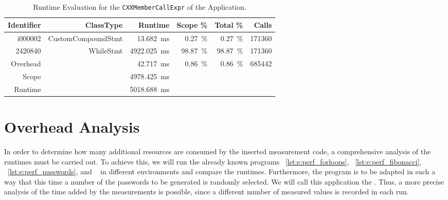 \begin{table}
  \centering
  \caption[Runtime Evaluation for the \lstinline{CXXMCall} of the \PRIME Application.]{Runtime Evaluation for the \lstinline{CXXMemberCallExpr} of the \PRIME Application.}
  \begin{tabular}{rrrrrr}
    \toprule
    Identifier & ClassType          & Runtime                      &  Scope \%            &  Total \%            & Calls\\
    \midrule
    i000002    & CustomCompoundStmt & \SI{13.682}{\milli\second}   & \SI{0.27}{\percent}  & \SI{0.27}{\percent}  & 171360 \\
    2420840    & WhileStmt          & \SI{4922.025}{\milli\second} & \SI{98.87}{\percent} & \SI{98.87}{\percent} & 171360 \\
    Overhead   &                    & \SI{42.717}{\milli\second}   & \SI{0.86}{\percent}  & \SI{0.86}{\percent}  & 685442 \\
    \midrule
    Scope      &                    & \SI{4978.425}{\milli\second} &                      &                      &       \\
    Runtime    &                    & \SI{5018.688}{\milli\second} &                      &                      &       \\
    \bottomrule
  \end{tabular}
  \label{tab:e:primeoutput2}
\end{table}

\section{Overhead Analysis}
\label{overheadAnalysis}
In order to determine how many additional resources are consumed by the inserted measurement code, a comprehensive analysis of the runtimes must be carried out. To achieve this, we will run the already known programs \VARYINGLOOP~\ref{lst:e:perf_forloops}, \FIBONACCI~\ref{lst:e:perf_fibonacci}, \PASSWORDGEN~\ref{lst:e:perf_passwords}, and \PRIME~\cite{PrimeBenchmark} in different environments and compare the runtimes. Furthermore, the \PASSWORDGEN program is to be adapted in such a way that this time a number of the passwords to be generated is randomly selected. We will call this application the \VARPASSWORDGEN. Thus, a more precise analysis of the time added by the measurements is possible, since a different number of measured values is recorded in each run. 
